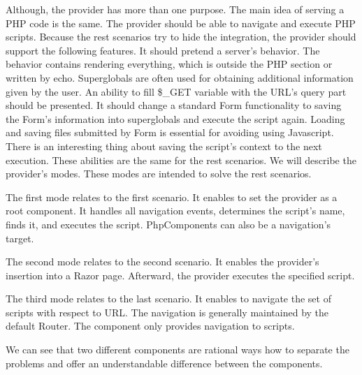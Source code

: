 Although, the provider has more than one purpose.
The main idea of serving a PHP code is the same.
The provider should be able to navigate and execute PHP scripts.
Because the rest scenarios try to hide the integration, the provider should support the following features.
It should pretend a server's behavior.
The behavior contains rendering everything, which is outside the PHP section or written by echo.
Superglobals are often used for obtaining additional information given by the user.
An ability to fill \$\_GET variable with the URL's query part should be presented.
It should change a standard Form functionality to saving the Form's information into superglobals and execute the script again.
Loading and saving files submitted by Form is essential for avoiding using Javascript.
There is an interesting thing about saving the script's context to the next execution.
These abilities are the same for the rest scenarios.
We will describe the provider's modes.
These modes are intended to solve the rest scenarios. 
\par
The first mode relates to the first scenario.
It enables to set the provider as a root component.
It handles all navigation events, determines the script's name, finds it, and executes the script.
PhpComponents can also be a navigation's target.
\par
The second mode relates to the second scenario.
It enables the provider's insertion into a Razor page.
Afterward, the provider executes the specified script.
\par
The third mode relates to the last scenario.
It enables to navigate the set of scripts with respect to URL.
The navigation is generally maintained by the default Router.
The component only provides navigation to scripts.
\par
We can see that two different components are rational ways how to separate the problems and offer an understandable difference between the components.


